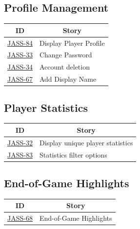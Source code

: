 \subsection{Profile Management}
\begin{tabular} { | m{1.75 cm} | m{5.25cm} | }
    \hline
    \multicolumn{1}{|c|}{ \textbf{ID}} & \multicolumn{1}{|c|}{ \textbf{Story} }  \\
    \hline
    \href{https://jasstracker-jira.atlassian.net/browse/JASS-84}{JASS-84} & Display Player Profile \\
    \hline
    \href{https://jasstracker-jira.atlassian.net/browse/JASS-33}{JASS-33} & Change Password \\
    \hline
    \href{https://jasstracker-jira.atlassian.net/browse/JASS-34}{JASS-34} & Account deletion \\
    \hline
    \href{https://jasstracker-jira.atlassian.net/browse/JASS-67}{JASS-67} & Add Display Name \\
    \hline
\end{tabular}

\subsection{Player Statistics}
\begin{tabular} { | m{1.75 cm} | m{5.25cm} | }
    \hline
    \multicolumn{1}{|c|}{ \textbf{ID}} & \multicolumn{1}{|c|}{ \textbf{Story} }  \\
    \hline
    \href{https://jasstracker-jira.atlassian.net/browse/JASS-32}{JASS-32} & Display unique player statistics \\
    \hline
    \href{https://jasstracker-jira.atlassian.net/browse/JASS-83}{JASS-83} & Statistics filter options \\
    \hline
\end{tabular}

\subsection{End-of-Game Highlights}
\begin{tabular} { | m{1.75 cm} | m{5.25cm} | }
    \hline
    \multicolumn{1}{|c|}{ \textbf{ID}} & \multicolumn{1}{|c|}{ \textbf{Story} } \\
    \hline
    \href{https://jasstracker-jira.atlassian.net/browse/JASS-68}{JASS-68} & End-of-Game Highlights \\
    \hline
\end{tabular}


